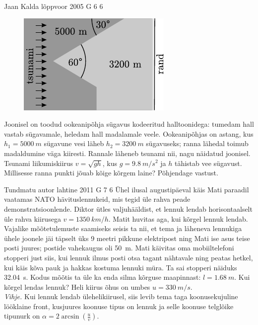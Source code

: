 \documentclass[11pt]{article}
\begin{document}
{%
{Jaan Kalda} %
{lõppvoor} %
{2005} %
{G 6} %
{6} %
{
\ifStatement
\begin{figure}
	\begin{center}
		\vspace{-20pt}
		\includegraphics[width=\linewidth]{2005-v3g-06-yl}
	\end{center}
\end{figure}

Joonisel on toodud ookeanipõhja sügavus kodeeritud halltoonidega: tumedam hall vastab sügavamale, heledam hall madalamale veele. Ookeanipõhjas on astang, kus $h_1 = \SI{5000}{m}$ sügavune vesi läheb $h_2 = \SI{3200}{m}$ sügavuseks; ranna lähedal toimub madaldumine väga kiiresti. Rannale läheneb tsunami nii, nagu näidatud joonisel. Tsunami liikumiskiirus $v = \sqrt{gh}$, kus $g = \SI{9,8}{m/s^2}$ ja $h$ tähistab vee sügavust. Millisesse ranna punkti jõuab kõige kõrgem laine? Põhjendage vastust.
\fi
}

{Tundmatu autor} %
{lahtine} %
{2011} %
{G 7} %
{6} %
{
\ifStatement
Ühel ilusal augustipäeval käis Mati paraadil vaatamas NATO hävituslennukeid, mis
tegid üle rahva peade demonstratsioonlende. Diktor ütles valjuhääldist, et lennuk
lendab horisontaalselt üle rahva kiirusega $v=\SI{1350}{km/h}$. Matit huvitas aga, kui
kõrgel lennuk lendab. Vajalike mõõtetulemuste saamiseks seisis ta nii, et tema
ja läheneva lennukiga ühele joonele jäi täpselt üks 9 meetri pikkune elektripost
ning Mati ise asus teise posti juures; postide vahekaugus oli \SI{50}{m}. Mati käivitas oma
mobiiltelefoni stopperi just siis, kui lennuk ilmus posti otsa tagant nähtavale ning 
peatas hetkel, kui käis kõva pauk ja hakkas kostuma lennuki müra. Ta sai
stopperi näiduks \SI{32,04}{s}. Kodus
mõõtis ta üle ka enda silma kõrguse maapinnast: $l=\SI{1,68}{m}$.
Kui kõrgel lendas lennuk? Heli kiirus õhus on umbes
$u=\SI{330}{m/s}$.\\ 
\textit{Vihje.} Kui lennuk lendab
ülehelikiirusel, siis levib tema taga
koonusekujuline lööklaine front, kusjuures koonuse tipus on lennuk ja selle
koonuse telglõike
tipunurk on $\alpha=2\arcsin\left(\frac{u}{v}\right)$.
\fi
}

}
\end{document}
